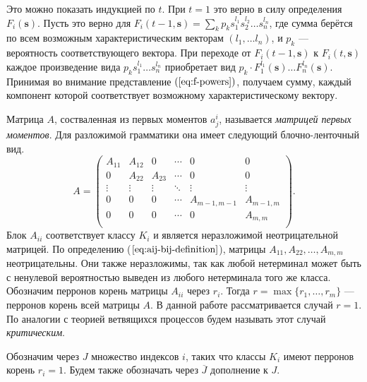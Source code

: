 \documentclass[12pt]{article}
\begin{document}
Это можно показать индукцией по $t$. При $t = 1$ это верно в силу определения $F_i(\mathbf{s})$. Пусть это верно для $F_i(t-1, \mathbf{s}) = \sum_k p_k s_1^{l_1} s_2^{l_2} \ldots s_n^{l_n}$, где сумма берётся по всем возможным характеристическим векторам $(l_1, \ldots l_n)$, и $p_k$ --- вероятность соответствующего вектора. При переходе от $F_i(t-1, \mathbf{s})$ к $F_i(t, \mathbf{s})$ каждое произведение вида $p_k s_1^{l_1} \ldots s_n^{l_n}$ приобретает вид $p_k \cdot F_1^{l_1}(\mathbf{s}) \ldots F_n^{l_n}(\mathbf{s})$. Принимая во внимание представление $(\ref{eq:f-powers})$, получаем сумму, каждый компонент которой соответствует возможному характеристическому вектору.

Матрица $A$, состваленная из первых моментов $a^i_j$, называется \textit{матрицей первых моментов}. Для разложимой грамматики она имеет следующий блочно-ленточный вид.
\begin{equation}
\label{eq:amatrix}
	A =
	\begin{pmatrix}
		A_{11} & A_{12} & 0      & \cdots & 0           & 0          \\
		0      & A_{22} & A_{23} & \cdots & 0           & 0          \\ 
		\vdots & \vdots & \vdots & \ddots & \vdots      & \vdots     \\
		0      & 0      & 0      & \cdots & A_{m-1,m-1} & A_{m-1, m} \\
		0      & 0      & 0      & \cdots & 0           & A_{m,m}    \\
	\end{pmatrix}.
\end{equation}
Блок $A_{ii}$ соответствует классу $K_i$ и является неразложимой неотрицательной матрицей. По определению ($\ref{eq:aij-bij-definition}$), матрицы $A_{11}, A_{22}, \ldots, A_{m,m}$ неотрицательны. Они также неразложимы, так как любой нетерминал может быть с ненулевой вероятностью выведен из любого нетерминала того же класса. Обозначим перронов корень \cite{gantmaher-matrix-theory} матрицы $A_{ii}$ через $r_i$. Тогда $r = \max\{r_1, \ldots, r_m\}$ --- перронов корень всей матрицы $A$. В данной работе рассматривается случай $r = 1$. По аналогии с теорией ветвящихся процессов \cite{sevast-processes} будем называть этот случай \textit{критическим}.

Обозначим через $J$ множество индексов $i$, таких что классы $K_i$ имеют перронов корень $r_i = 1$. Будем также обозначать через $\overline{J}$ дополнение к $J$.
\end{document}
